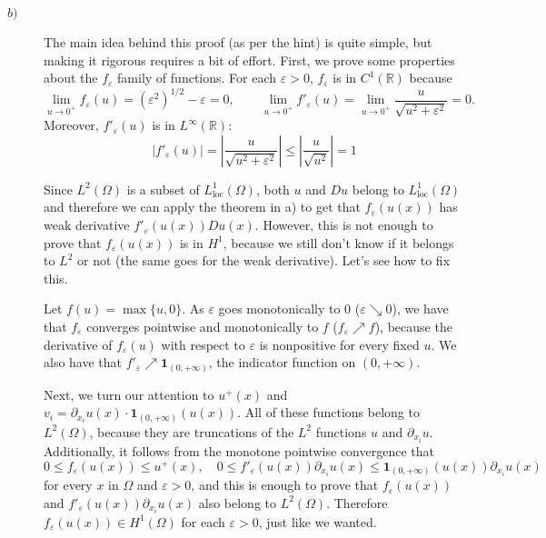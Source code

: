\documentclass[a4paper]{article}
\newcommand{\abs}[1]{\left\lvert#1\right\rvert}
\newcommand{\R}{\mathbb{R}}
\begin{document}
\begin{description}
\item[$b)$] The main idea behind this proof (as per the hint) is quite simple,
	but making it rigorous requires a bit of effort.
	First, we prove some properties about the $f_\varepsilon$ family of functions.
	For each $\varepsilon > 0$, $f_\varepsilon$ is in $C^1(\R)$ because
	\[
	\lim_{u \to 0^+} f_\varepsilon(u)
	= (\varepsilon^2)^{1/2}-\varepsilon = 0, \qquad
	\lim_{u \to 0^+} f'_\varepsilon(u)
	= \lim_{u \to 0^+} \frac{u}{\sqrt{u^2+\varepsilon^2}} = 0.
	\]
	Moreover, $f'_\varepsilon(u)$ is in $L^\infty(\R)$:
	\[
	\abs{f'_\varepsilon(u)} = \abs{\frac{u}{\sqrt{u^2+\varepsilon^2}}}
	\leq \abs{\frac{u}{\sqrt{u^2}}} = 1
	\]
	
	Since $L^2(\Omega)$ is a subset of $L^1_\text{loc}(\Omega)$,
	both $u$ and $Du$ belong to $L^1_\text{loc}(\Omega)$ and therefore
	we can apply the theorem in a) to get that $f_\varepsilon(u(x))$
	has weak derivative $f'_\varepsilon(u(x)) Du(x)$.
	However, this is not enough to prove that $f_\varepsilon(u(x))$ is in $H^1$,
	because we still don't know if it belongs to $L^2$ or not (the same goes
	for the weak derivative). Let's see how to fix this.
	
	Let $f(u) = \max\{u,0\}$. As $\varepsilon$ goes monotonically to $0$
	($\varepsilon \searrow 0$), we have that $f_\varepsilon$ converges
	pointwise and monotonically to $f$ ($f_\varepsilon \nearrow f$),
	because the derivative of $f_\varepsilon(u)$ with respect
	to $\varepsilon$ is nonpositive for every fixed $u$.
	We also have that $f'_\varepsilon \nearrow \textbf{1}_{(0,+\infty)}$,
	the indicator function on $(0,+\infty)$.
	
	Next, we turn our attention to $u^+(x)$ and
	$v_i = \partial_{x_i} u(x) \cdot \textbf{1}_{(0,+\infty)}(u(x))$.
	All of these functions belong to $L^2(\Omega)$, because they are truncations
	of the $L^2$ functions $u$ and $\partial_{x_i} u$.
	Additionally, it follows from the monotone pointwise convergence that
	\[
	0 \leq f_\varepsilon(u(x)) \leq u^+(x), \quad
	0 \leq f'_\varepsilon(u(x)) \partial_{x_i} u(x)
	\leq \textbf{1}_{(0,+\infty)}(u(x)) \partial_{x_i} u(x)
	\]
	for every $x$ in $\Omega$ and $\varepsilon > 0$, and this is enough
	to prove that $f_\varepsilon(u(x))$ and
	$f'_\varepsilon(u(x)) \partial_{x_i} u(x)$ also belong to $L^2(\Omega)$.
	Therefore $f_\varepsilon(u(x)) \in H^1(\Omega)$ for each $\varepsilon > 0$,
	just like we wanted.
	

\end{description}
\end{document}
